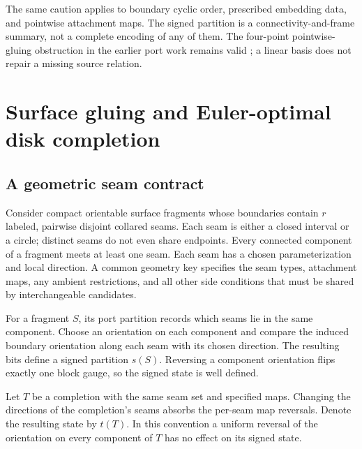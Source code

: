 \documentclass[11pt,letterpaper]{article}
\theoremstyle{definition}
\begin{document}
The same caution applies to boundary cyclic order, prescribed embedding data, and pointwise attachment maps. The signed partition is a connectivity-and-frame summary, not a complete encoding of any of them. The four-point pointwise-gluing obstruction in the earlier port work remains valid \cite{ports,compiled}; a linear basis does not repair a missing source relation.

\section{Surface gluing and Euler-optimal disk completion}
\label{sec:surfaces}

\subsection{A geometric seam contract}
Consider compact orientable surface fragments whose boundaries contain $r$ labeled, pairwise disjoint collared seams. Each seam is either a closed interval or a circle; distinct seams do not even share endpoints. Every connected component of a fragment meets at least one seam. Each seam has a chosen parameterization and local direction. A common geometry key specifies the seam types, attachment maps, any ambient restrictions, and all other side conditions that must be shared by interchangeable candidates.

For a fragment $S$, its port partition records which seams lie in the same component. Choose an orientation on each component and compare the induced boundary orientation along each seam with its chosen direction. The resulting bits define a signed partition $s(S)$. Reversing a component orientation flips exactly one block gauge, so the signed state is well defined.

Let $T$ be a completion with the same seam set and specified maps. Changing the directions of the completion's seams absorbs the per-seam map reversals. Denote the resulting state by $t(T)$. In this convention a uniform reversal of the orientation on every component of $T$ has no effect on its signed state.
\end{document}
